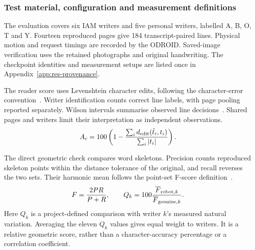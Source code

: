 \subsubsection{Test material, configuration and measurement definitions}
\label{sec:res-method}
The evaluation covers six IAM writers and five personal writers, labelled A, B, O, T and Y. Fourteen reproduced pages give 184 transcript-paired lines. Physical motion and request timings are recorded by the ODROID. Saved-image verification uses the retained photographs and original handwriting. The checkpoint identities and measurement setups are listed once in Appendix~\ref{app:res-provenance}.

The reader score uses Levenshtein character edits, following the character-error convention~\cite[p.~2]{graves2006}. Writer identification counts correct line labels, with page pooling reported separately. Wilson intervals summarise observed line decisions~\cite[pp.~209--212]{wilson1927}. Shared pages and writers limit their interpretation as independent observations.
\begin{equation}
A_c=100\left(1-\frac{\sum_i d_{\rm edit}(\hat t_i,t_i)}{\sum_i |t_i|}\right).
\label{eq:res-char}
\end{equation}

The direct geometric check compares word skeletons. Precision counts reproduced skeleton points within the distance tolerance of the original, and recall reverses the two sets. Their harmonic mean follows the point-set F-score definition~\cite{tanks2017}.
\begin{equation}
F=\frac{2PR}{P+R},\qquad
Q_k=100\frac{\overline F_{{\rm robot},k}}{\overline F_{{\rm genuine},k}}.
\label{eq:res-geometric}
\end{equation}
Here $Q_k$ is a project-defined comparison with writer $k$'s measured natural variation. Averaging the eleven $Q_k$ values gives equal weight to writers. It is a relative geometric score, rather than a character-accuracy percentage or a correlation coefficient.

